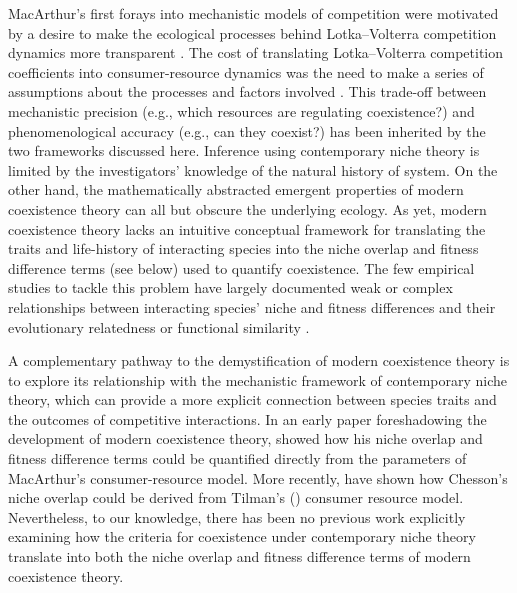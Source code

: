 MacArthur's first forays into mechanistic models of competition were motivated by a desire to make the ecological processes behind Lotka--Volterra competition dynamics more transparent \citep{MacArthur1964, MacArthur1970, macarthur1972}. The cost of translating Lotka--Volterra competition coefficients into consumer-resource dynamics was the need to make a series of assumptions about the processes and factors involved \citep{Chesson1990}. This trade-off between mechanistic precision (e.g., which resources are regulating coexistence?) and phenomenological accuracy (e.g., can they coexist?) has been inherited by the two frameworks discussed here. Inference using contemporary niche theory is limited by the investigators' knowledge of the natural history of system. On the other hand, the mathematically abstracted emergent properties of modern coexistence theory can all but obscure the underlying ecology. As yet, modern coexistence theory lacks an intuitive conceptual framework for translating the traits and life-history of interacting species into the niche overlap and fitness difference terms (see below) used to quantify coexistence. The few empirical studies to tackle this problem have largely documented weak or complex relationships between interacting species' niche and fitness differences and their evolutionary relatedness or functional similarity \citep{Narwani2013, Godoy2014, Kraft2015, Germain2016}.
\par


A complementary pathway to the demystification of modern coexistence theory is to explore its relationship with the mechanistic framework of contemporary niche theory, which can provide a more explicit connection between species traits and the outcomes of competitive interactions. In an early paper foreshadowing the development of modern coexistence theory, \citet{Chesson1990} showed how his niche overlap and fitness difference terms could be quantified directly from the parameters of MacArthur's consumer-resource model. More recently, \citet{Kleinhesselink2015} have shown how Chesson's niche overlap could be derived from Tilman's (\citeyear{tilman1982}) consumer resource model. Nevertheless, to our knowledge, there has been no previous work explicitly examining how the criteria for coexistence under contemporary niche theory translate into both the niche overlap and fitness difference terms of modern coexistence theory.
\par


